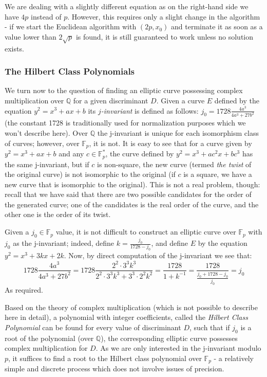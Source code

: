 \documentclass[11pt,english]{article}
\begin{document}
We are dealing with a slightly different equation as on the right-hand side we have $4p$ instead of $p$. However, this requires only a slight change in
the algorithm - if we start the Euclidean algorithm with $(2p,x_0)$ and terminate it as soon as a value lower than $2\sqrt{p}$ is found, it is still guaranteed
to work unless no solution exists.

\subsubsection{The Hilbert Class Polynomials}
We turn now to the question of finding an elliptic curve possessing complex multiplication over $\mathbb{Q}$ for a given discriminant $D$. Given a
curve $E$ defined by the equation $y^2=x^3+ax+b$ its \emph{$j$-invariant} is defined as follows: $j_0=1728\frac{4a^3}{4a^3+27b^2}$ (the
constant 1728 is traditionally used for normalization purposes which we won't describe here). Over $\mathbb{Q}$ the j-invariant is unique for each
isomorphism class of curves; however, over $\mathbb{F}_p$, it is not. It is easy to see that for a curve given by $y^2=x^3+ax+b$ and any $c\in\mathbb{F}^*_p$,
the curve defined by $y^2=x^3+ac^2x+bc^3$ has the same j-invariant, but if $c$ is non-square, the new curve (termed \emph{the twist} of the original curve)
is not isomorphic to the original (if $c$ is a square, we have a new curve that is isomorphic to the original). This is not a real problem, though: recall that we have said that there are two possible candidates for the order of
the generated curve; one of the candidates is the real order of the curve, and the other one is the order of its twist.

Given a $j_0\in\mathbb{F}_p$ value, it is not difficult to construct an elliptic curve over $\mathbb{F}_p$ with $j_0$ as the j-invariant;
indeed, define $k=\frac{j_0}{1728-j_0}$, and define $E$ by the equation $y^2=x^3+3kx+2k$. Now, by direct computation of the j-invariant we see that:
$$1728\frac{4a^3}{4a^3+27b^2}=1728\frac{2^2\cdot 3^3k^3}{2^2\cdot 3^3k^3+3^3\cdot 2^2k^2}=\frac{1728}{1+k^{-1}}=
\frac{1728}{\frac{j_0+1728-j_0}{j_0}}=j_0$$
As required.

Based on the theory of complex multiplication (which is not possible to describe here in detail), a polynomial with integer coefficients, called the \emph{Hilbert Class Polynomial}
can be found for every value of discriminant $D$, such that if $j_0$ is a root of the polynomial (over $\mathbb{Q}$), the corresponding elliptic curve
possesses complex multiplication for $D$. As we are only interested in the j-invariant modulo $p$, it suffices to find a root to the Hilbert class polynomial
over $\mathbb{F}_p$ - a relatively simple and discrete process which does not involve issues of precision.
\end{document}
